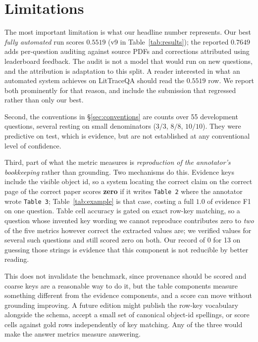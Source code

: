 \documentclass[11pt]{article}
\begin{document}
\section{Limitations}
\label{sec:limitations}

The most important limitation is what our headline number represents. Our best
\emph{fully automated} run scores $\mathbf{0.5519}$ (v9 in
Table~\ref{tab:results}); the reported $0.7649$ adds per-question auditing
against source PDFs and corrections attributed using leaderboard feedback. The
audit is not a model that would run on new questions, and the attribution is
adaptation to this split. A reader interested in what an automated system
achieves on LitTraceQA should read the $0.5519$ row. We report both prominently
for that reason, and include the submission that regressed rather than only our
best.

Second, the conventions in \S\ref{sec:conventions} are counts over 55 development
questions, several resting on small denominators ($3/3$, $8/8$, $10/10$). They
were predictive on test, which is evidence, but are not established at any
conventional level of confidence.

Third, part of what the metric measures is \emph{reproduction of the annotator's
bookkeeping} rather than grounding. Two mechanisms do this. Evidence keys include
the visible object id, so a system locating the correct claim on the correct page
of the correct paper scores \textbf{zero} if it writes \texttt{Table 2} where the
annotator wrote \texttt{Table 3}; Table~\ref{tab:example} is that case, costing a
full $1.0$ of evidence F1 on one question. Table cell accuracy is gated on exact
row-key matching, so a question whose invented key wording we cannot reproduce
contributes zero to \emph{two} of the five metrics however correct the extracted
values are; we verified values for several such questions and still scored zero
on both. Our record of 0 for 13 on guessing those strings is evidence that this
component is not reducible by better reading.

This does not invalidate the benchmark, since provenance should be scored and
coarse keys are a reasonable way to do it, but the table components measure
something different from the evidence components, and a score can move without
grounding improving. A future edition might publish the row-key vocabulary
alongside the schema, accept a small set of canonical object-id spellings, or
score cells against gold rows independently of key matching. Any of the three
would make the answer metrics measure answering.
\end{document}
